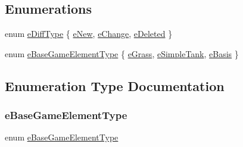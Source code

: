 \subsection*{Enumerations}
\begin{DoxyCompactItemize}
\item 
enum \hyperlink{a00047_ab32e61d383765a32bc5f9efebb4b9f55}{e\+Diff\+Type} \{ \hyperlink{a00047_ab32e61d383765a32bc5f9efebb4b9f55a431f77ddbb89863e0f6dbf088b85628c}{e\+New}, 
\hyperlink{a00047_ab32e61d383765a32bc5f9efebb4b9f55a81da2210193d7fc78e7084b58a1c4e0c}{e\+Change}, 
\hyperlink{a00047_ab32e61d383765a32bc5f9efebb4b9f55acef5c6e771d3a07f656e07a13a20ba35}{e\+Deleted}
 \}
\item 
enum \hyperlink{a00047_a5afb9d86324dabec6a0c73f9b6aa1baf}{e\+Base\+Game\+Element\+Type} \{ \hyperlink{a00047_a5afb9d86324dabec6a0c73f9b6aa1bafa107c023644773dc2cde1d0047d6bc79c}{e\+Grass}, 
\hyperlink{a00047_a5afb9d86324dabec6a0c73f9b6aa1bafa8be91a43861bfbfc5c5c0a2ba4898e30}{e\+Simple\+Tank}, 
\hyperlink{a00047_a5afb9d86324dabec6a0c73f9b6aa1bafa18b2b8475de0a17c5561231466d40c7d}{e\+Basis}
 \}
\end{DoxyCompactItemize}


\subsection{Enumeration Type Documentation}
\mbox{\label{a00047_a5afb9d86324dabec6a0c73f9b6aa1baf}} 
\subsubsection{\texorpdfstring{e\+Base\+Game\+Element\+Type}{eBaseGameElementType}}
{\footnotesize\ttfamily enum \hyperlink{a00047_a5afb9d86324dabec6a0c73f9b6aa1baf}{e\+Base\+Game\+Element\+Type}}

